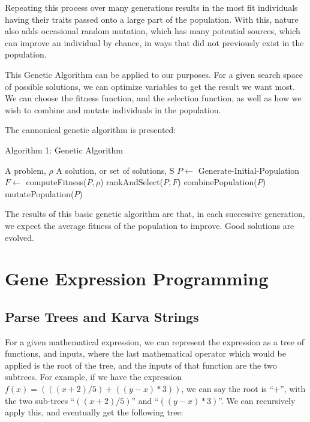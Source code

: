 \documentclass[a4paper,11pt]{report}
\begin{document}
Repeating this process over many generations results in the most fit individuals having their traits 
passed onto a large part of the population. With this, nature also adds occasional random mutation, 
which has many potential sources, which can improve an individual by chance, in ways that did not 
previously exist in the population.

This Genetic Algorithm can be applied to our purposes. For a given search space of possible solutions, 
we can optimize variables to get the result we want most. We can choose the fitness function, and the selection 
function, as well as how we wish to combine and mutate individuals in the population. 

The cannonical genetic algorithm is presented:

\begin{algorithm}
\caption{Algorithm 1: Genetic Algorithm}
\renewcommand{\algorithmicrequire}{\textbf{Input:}}
\renewcommand{\algorithmicensure}{\textbf{Output:}}
\begin{algorithmic}[1]
\REQUIRE A problem, $\rho$
\ENSURE A solution, or set of solutions, S
\STATE $P \leftarrow$ Generate-Initial-Population
  \STATE $F \leftarrow $ computeFitness($P, \rho$)
  \STATE rankAndSelect($P, F$)
  \STATE combinePopulation($P$)
  \STATE mutatePopulation($P$)
\ENDWHILE

\end{algorithmic}
\end{algorithm}  

The results of this basic genetic algorithm are that, in each successive generation, we expect the average
fitness of the population to improve. Good solutions are evolved. 


\section{Gene Expression Programming}

\subsection{Parse Trees and Karva Strings}
For a given mathematical expression, we can represent the expression as a tree of functions, and inputs, 
where the last mathematical operator which would be applied is the root of the tree, and the 
inputs of that function are the two subtrees. For example, if 
we have the expression $f(x) = (((x+2)/5) + ((y-x) * 3))$, we can say the root is ``$+$'', with the 
two sub-trees ``$((x+2)/5)$'' and ``$((y-x) * 3)$''. We can recursively apply this, and eventually get 
the following tree: \\[0.8cm]
\end{document}
